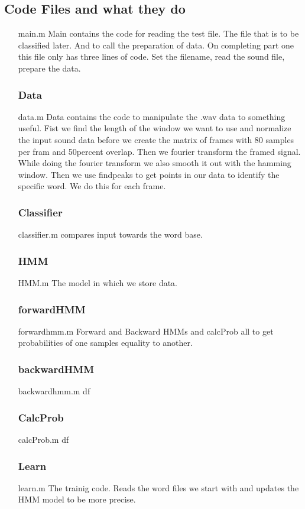 \documentclass[titlepage]{article}
\begin{document}
\subsection{Code Files and what they do}
\begin{itemize}
\subsubsection{Main} \item[main.m] Main contains the code for reading the test file. The file that is to be classified later. And to call the preparation of data. On completing part one this file only has three lines of code. Set the filename, read the sound file, prepare the data.
\subsubsection{Data} \item[data.m] Data contains the code to manipulate the .wav data to something useful. Fist we find the length of the window we want to use and normalize the input sound data before we create the matrix of frames with 80 samples per fram and 50percent overlap. Then we fourier transform the framed signal. While doing the fourier transform we also smooth it out with the hamming window. Then we use findpeaks to get points in our data to identify the specific word. We do this for each frame.  
\subsubsection{Classifier}\item[classifier.m] compares input towards the word base. 
\subsubsection{HMM}\item[HMM.m] The model in which we store data.
\subsubsection{forwardHMM}\item[forwardhmm.m] Forward and Backward HMMs and calcProb all to get probabilities of one samples equality to another.
\subsubsection{backwardHMM}\item[backwardhmm.m] df
\subsubsection{CalcProb}\item[calcProb.m] df
\subsubsection{Learn}\item[learn.m] The trainig code. Reads the word files we start with and updates the HMM model to be more precise.  

\end{itemize}
\end{document}
